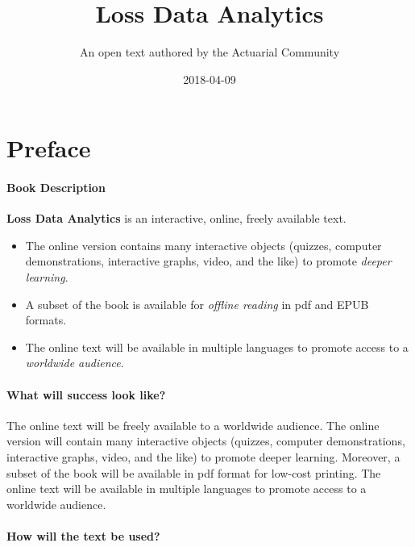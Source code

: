 \documentclass[]{book}
\title{Loss Data Analytics}
\author{An open text authored by the Actuarial Community}
\date{2018-04-09}
\theoremstyle{definition}
\theoremstyle{definition}
\theoremstyle{definition}
\theoremstyle{remark}
\begin{document}
\maketitle

{
\setcounter{tocdepth}{2}
\tableofcontents
}
\chapter*{Preface}\label{preface}

\subsubsection*{Book Description}\label{book-description}

\textbf{Loss Data Analytics} is an interactive, online, freely available
text.

\begin{itemize}
\item
  The online version contains many interactive objects (quizzes,
  computer demonstrations, interactive graphs, video, and the like) to
  promote \emph{deeper learning}.
\item
  A subset of the book is available for \emph{offline reading} in pdf
  and EPUB formats.
\item
  The online text will be available in multiple languages to promote
  access to a \emph{worldwide audience}.
\end{itemize}

\subsubsection*{What will success look
like?}\label{what-will-success-look-like}

The online text will be freely available to a worldwide audience. The
online version will contain many interactive objects (quizzes, computer
demonstrations, interactive graphs, video, and the like) to promote
deeper learning. Moreover, a subset of the book will be available in pdf
format for low-cost printing. The online text will be available in
multiple languages to promote access to a worldwide audience.

\subsubsection*{How will the text be
used?}\label{how-will-the-text-be-used}
\end{document}
